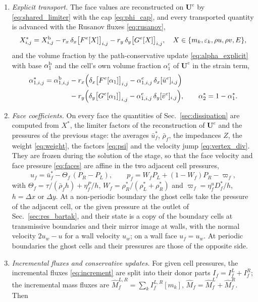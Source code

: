 \begin{enumerate}
\item \emph{Explicit transport.} The face values are reconstructed on $\mathbf U^e$ by \eqref{eq:shared_limiter} with the cap \eqref{eq:phi_cap}, and every
transported quantity is advanced with the Rusanov fluxes \eqref{eq:rusanov},
\[
X^*_{i,j}=X^{\rm b}_{i,j}-r_x\,\delta_x\big[F^e[X]\big]_{i,j}-r_y\,\delta_y\big[G^e[X]\big]_{i,j},\quad
X\in\{m_k,\varepsilon_k,\rho u,\rho v,E\},
\]
and the volume fraction by the path-conservative update
\eqref{eq:alpha_explicit} with base $\alpha^{\rm b}_1$ and the cell's own volume fraction $\alpha^e_1$ of $\mathbf U^e$ in the strain term,
\[
\begin{aligned}
\alpha^*_{1,i,j}=\alpha^{\rm b}_{1,i,j}&-r_x\Big(\delta_x\big[F^e[\alpha_1]\big]_{i,j}-\alpha^e_{1,i,j}\,\delta_x[\bar u^e]_{i,j}\Big)\\
&-r_y\Big(\delta_y\big[G^e[\alpha_1]\big]_{i,j}-\alpha^e_{1,i,j}\,\delta_y[\bar v^e]_{i,j}\Big),\qquad \alpha^*_2=1-\alpha^*_1 .
\end{aligned}
\]
\item \emph{Face coefficients.} On every face the quantities of Sec.~\ref{sec:dissipation} are computed from $X^*$, the
limiter factors of the reconstruction of $\mathbf U^e$ and the pressures of the previous stage: the averages $\bar u^*_f$, $\bar\rho_f$, the impedances $Z$, the weight \eqref{eq:weight},
the factors \eqref{eq:psi} and the velocity jump \eqref{eq:vertex_div}. They are frozen during the solution of the stage,
so that the face velocity and face pressure \eqref{eq:faces} are affine in the two adjacent cell pressures,
\[
u_f=\bar u^*_f-\Theta_f\,(P_R-P_L),\qquad p_f=W_fP_L+(1-W_f)P_R-\varpi_f ,
\]
with $\Theta_f=\tau/(\bar\rho_f h)+\eta^P_f/h$, $W_f=\rho^*_R/(\rho^*_L+\rho^*_R)$ and $\varpi_f=\eta^u_fD^*_f/h$, $h=\Delta x$ or $\Delta y$. At a non-periodic boundary the
ghost cells take the pressure of the adjacent cell, or the given pressure at the outlet of Sec.~\ref{sec:res_bartak}, and their state is a copy of the boundary cells at transmissive
boundaries and their mirror image at walls, with the normal velocity $2u_w-u$ for a wall velocity $u_w$; on a wall face $u_f=u_w$. At periodic boundaries the ghost cells and their pressures are those of the opposite side.
\item \emph{Incremental fluxes and conservative updates.} For given cell pressures, the incremental fluxes
\eqref{eq:increment} are split into their donor parts $I_f=I^L_f+I^R_f$; the incremental mass fluxes are
$\hat M^{L,R}_f=\sum_kI^{L,R}_f[m_k]$, $\hat M_f=\hat M^L_f+\hat M^R_f$. Then

\end{enumerate}
